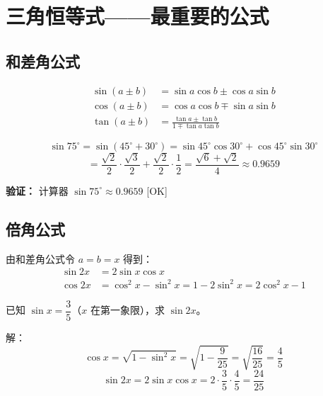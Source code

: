 \section{三角恒等式——最重要的公式}

\subsection{和差角公式}

\begin{theorembox}[和差角公式]
\begin{align*}
\sin(a \pm b) &= \sin a \cos b \pm \cos a \sin b \\
\cos(a \pm b) &= \cos a \cos b \mp \sin a \sin b \\
\tan(a \pm b) &= \frac{\tan a \pm \tan b}{1 \mp \tan a \tan b}
\end{align*}
\end{theorembox}

\begin{examplebox}
\[
\sin 75^\circ = \sin(45^\circ + 30^\circ) = \sin 45^\circ \cos 30^\circ + \cos 45^\circ \sin 30^\circ
\]
\[
= \frac{\sqrt{2}}{2} \cdot \frac{\sqrt{3}}{2} + \frac{\sqrt{2}}{2} \cdot \frac{1}{2}
= \frac{\sqrt{6} + \sqrt{2}}{4} \approx 0.9659
\]

\textbf{验证：} 计算器 \(\sin 75^\circ \approx 0.9659\) [OK]
\end{examplebox}

\subsection{倍角公式}

\begin{theorembox}[倍角公式]
由和差角公式令 \(a = b = x\) 得到：
\begin{align*}
\sin 2x &= 2\sin x \cos x \\
\cos 2x &= \cos^2 x - \sin^2 x = 1 - 2\sin^2 x = 2\cos^2 x - 1
\end{align*}
\end{theorembox}

\begin{examplebox}[4——倍角公式的应用]
已知 \(\sin x = \dfrac{3}{5}\)（\(x\) 在第一象限），求 \(\sin 2x\)。

解：
\[
\cos x = \sqrt{1 - \sin^2 x} = \sqrt{1 - \frac{9}{25}} = \sqrt{\frac{16}{25}} = \frac{4}{5}
\]
\[
\sin 2x = 2\sin x \cos x = 2 \cdot \frac{3}{5} \cdot \frac{4}{5} = \frac{24}{25}
\]
\end{examplebox}

